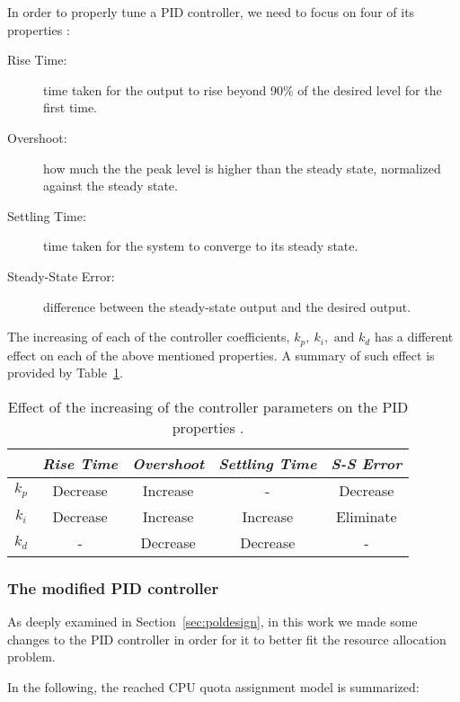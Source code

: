 In order to properly tune a PID controller, we need to focus on four of its properties \cite{zhong2006pid}:
\begin{description}
\item[Rise Time:] time taken for the output to rise beyond 90\% of the desired level for the first time.
\item[Overshoot:] how much the the peak level is higher than the steady state, normalized against the steady state.
\item[Settling Time:] time taken for the system to converge to its steady state.
\item[Steady-State Error:] difference between the steady-state output and the desired output.
\end{description}

The increasing of each of the controller coefficients, $k_p,\ k_i, \text{ and } k_d$ has a different effect on each of the above mentioned properties. A summary of such effect is provided by Table~\ref{tab:pideffect}.

\begin{table}[t]
    \centering
    \begin{tabular}{|c||c|c|c|c|}
        \cline{2-5}
         \multicolumn{1}{l||}{}& \emph{Rise Time} & \emph{Overshoot} & \emph{Settling Time} & \emph{S-S Error}\\
        \hline\hline
        $k_{p}$ & Decrease & Increase & - & Decrease\\
        $k_{i}$ & Decrease & Increase & Increase & Eliminate\\
        $k_{d}$ & - & Decrease & Decrease & - \\
        \hline
    \end{tabular}
    \caption{Effect of the increasing of the controller parameters on the PID properties \cite{zhong2006pid}.}
    \label{tab:pideffect}
\end{table}

\subsubsection{The modified PID controller}
As deeply examined in Section~\ref{sec:poldesign}, in this work we made some changes to the PID controller in order for it to better fit the resource allocation problem.

In the following, the reached CPU quota assignment model is summarized:

